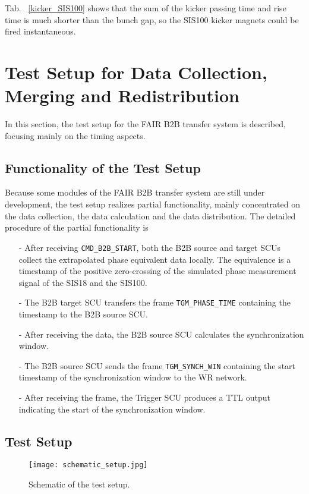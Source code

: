 Tab. ~\ref{kicker_SIS100} shows that the sum of the kicker passing time and rise time is much shorter than the bunch gap, so the SIS100 kicker magnets could be fired instantaneous. 
\section{Test Setup for Data Collection, Merging and Redistribution}

In this section, the test setup for the FAIR B2B transfer system is described, focusing mainly on the timing aspects.  

\subsection{Functionality of the Test Setup}
Because some modules of the FAIR B2B transfer system are still under development, the test setup realizes partial functionality,  mainly concentrated on the data collection, the data calculation and the data distribution. The detailed procedure of the partial functionality is
\begin{itemize}
\item[-] After receiving \verb|CMD_B2B_START|, both the B2B source and target SCUs collect the extrapolated phase equivalent data locally. The equivalence is a timestamp of the positive zero-crossing of the simulated phase measurement signal of the SIS18 and the SIS100. 
\item[-] The B2B target SCU transfers the frame \verb|TGM_PHASE_TIME| containing the timestamp to the B2B source SCU.
\item[-] After receiving the data, the B2B source SCU calculates the synchronization window.
\item[-] The B2B source SCU sends the frame \verb|TGM_SYNCH_WIN| containing the start timestamp of the synchronization window to the WR network.
\item[-] After receiving the frame, the Trigger SCU produces a TTL output indicating the start of the synchronization window. 
\end{itemize}

\subsection{Test Setup}

\begin{figure}[H]
   \centering   
   \texttt{[image: schematic\_setup.jpg]}
   \caption{Schematic of the test setup.}
   \label{setup}
\end{figure}

